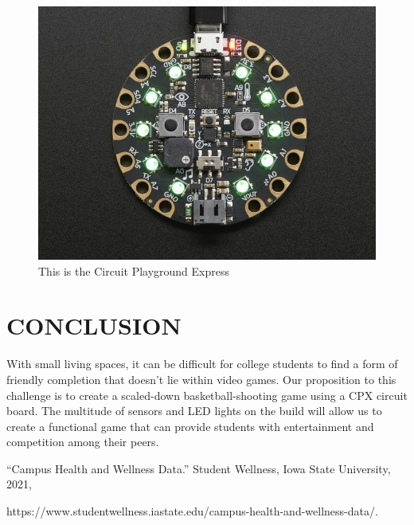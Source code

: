 \documentclass[12pt]{article}
\begin{document}
  \begin{figure}[!t]
\centering
\includegraphics[width=4.5in]{cpx01.jpg}
\caption{This is the Circuit Playground Express}
\label{fig:cpx}
\end{figure}

\section{CONCLUSION}
With small living spaces, it can be difficult for college students to find a form of friendly completion that doesn't lie within video games. Our proposition to this challenge is to create a scaled-down basketball-shooting game using a CPX circuit board. The multitude of sensors and LED lights on the build will allow us to create a functional game that can provide students with entertainment and competition among their peers.

\newpage
\printbibliography[heading=subbibintoc]
%
%
“Campus Health and Wellness Data.” Student Wellness, Iowa State University, 2021,

https://www.studentwellness.iastate.edu/campus-health-and-wellness-data/. 
\end{document}
